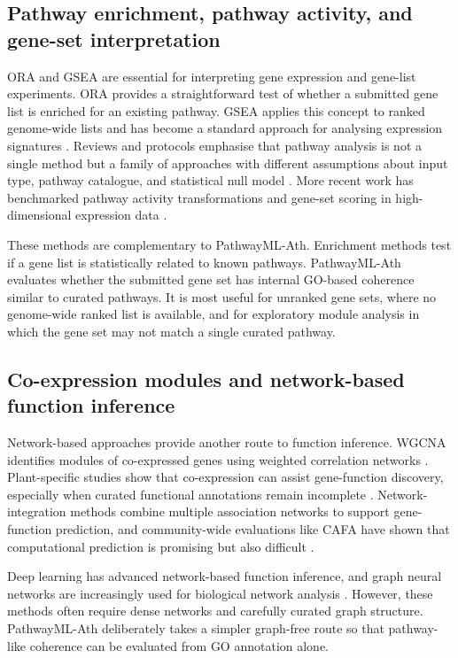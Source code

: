 \documentclass[12pt,twoside]{article}
\begin{document}
\subsection{Pathway enrichment, pathway activity, and gene-set interpretation}
\label{sec:lit_enrichment}

ORA and GSEA are essential for interpreting gene expression and gene-list experiments. ORA provides a straightforward test of whether a submitted gene list is enriched for an existing pathway. GSEA applies this concept to ranked genome-wide lists and has become a standard approach for analysing expression signatures \citep{subramanian2005gsea}. Reviews and protocols emphasise that pathway analysis is not a single method but a family of approaches with different assumptions about input type, pathway catalogue, and statistical null model \citep{khatri2012ten}. More recent work has benchmarked pathway activity transformations and gene-set scoring in high-dimensional expression data \citep{zhang2020pathway}.

These methods are complementary to PathwayML-Ath. Enrichment methods test if a gene list is statistically related to known pathways. PathwayML-Ath evaluates whether the submitted gene set has internal GO-based coherence similar to curated pathways. It is most useful for unranked gene sets, where no genome-wide ranked list is available, and for exploratory module analysis in which the gene set may not match a single curated pathway.

\subsection{Co-expression modules and network-based function inference}
\label{sec:lit_networks}

Network-based approaches provide another route to function inference. WGCNA identifies modules of co-expressed genes using weighted correlation networks \citep{langfelder2008wgcna}. Plant-specific studies show that co-expression can assist gene-function discovery, especially when curated functional annotations remain incomplete \citep{obayashi2018atted,usadel2009coexpression,liesecke2018ranking}. Network-integration methods combine multiple association networks to support gene-function prediction, and community-wide evaluations like CAFA have shown that computational prediction is promising but also difficult \citep{radivojac2013community}.

Deep learning has advanced network-based function inference, and graph neural networks are increasingly used for biological network analysis \citep{muzio2021biological}. However, these methods often require dense networks and carefully curated graph structure. PathwayML-Ath deliberately takes a simpler graph-free route so that pathway-like coherence can be evaluated from GO annotation alone.
\end{document}
